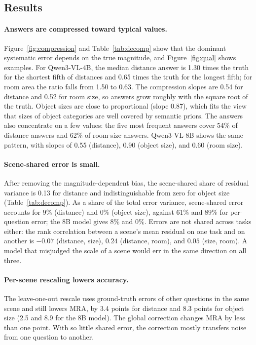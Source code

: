 \documentclass[letterpaper]{article} %
\begin{document}
\subsection{Results}

\paragraph{Answers are compressed toward typical values.}
Figure~\ref{fig:compression} and Table~\ref{tab:decomp} show that the dominant systematic error depends on the true magnitude, and Figure~\ref{fig:qual} shows examples. For Qwen3-VL-4B, the median distance answer is 1.30 times the truth for the shortest fifth of distances and 0.65 times the truth for the longest fifth; for room area the ratio falls from 1.50 to 0.63. The compression slopes are 0.54 for distance and 0.52 for room size, so answers grow roughly with the square root of the truth. Object sizes are close to proportional (slope 0.87), which fits the view that sizes of object categories are well covered by semantic priors. The answers also concentrate on a few values: the five most frequent answers cover 54\% of distance answers and 62\% of room-size answers. Qwen3-VL-8B shows the same pattern, with slopes of 0.55 (distance), 0.90 (object size), and 0.60 (room size).

\paragraph{Scene-shared error is small.}
After removing the magnitude-dependent bias, the scene-shared share of residual variance is 0.13 for distance and indistinguishable from zero for object size (Table~\ref{tab:decomp}). As a share of the total error variance, scene-shared error accounts for 9\% (distance) and 0\% (object size), against 61\% and 89\% for per-question error; the 8B model gives 8\% and 0\%. Errors are not shared across tasks either: the rank correlation between a scene's mean residual on one task and on another is $-0.07$ (distance, size), $0.24$ (distance, room), and $0.05$ (size, room). A model that misjudged the scale of a scene would err in the same direction on all three.

\paragraph{Per-scene rescaling lowers accuracy.}
The leave-one-out rescale uses ground-truth errors of other questions in the same scene and still lowers MRA, by 3.4 points for distance and 8.3 points for object size (2.5 and 8.9 for the 8B model). The global correction changes MRA by less than one point. With so little shared error, the correction mostly transfers noise from one question to another.
\end{document}
